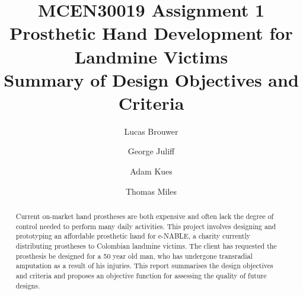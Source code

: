 \documentclass[12pt,3p]{elsarticle}
\begin{document}
\begin{frontmatter}

\title{MCEN30019 Assignment 1 \\
\small Prosthetic Hand Development for Landmine Victims \\
\small Summary of Design Objectives and Criteria}

\author{Lucas Brouwer}
\author{George Juliff}
\author{Adam Kues}
\author{Thomas Miles}

\begin{abstract}
Current on-market hand prostheses are both expensive and often lack the degree of control needed to perform many daily activities. This project involves designing and prototyping an affordable prosthetic hand for e-NABLE, a charity currently distributing prostheses to Colombian landmine victims. The client \citep{Walbran} has requested the prosthesis be designed for a 50 year old man, who has undergone transradial amputation as a result of his injuries. This report summarises the design objectives and criteria and proposes an objective function for assessing the quality of future designs.
\end{abstract}

\end{frontmatter}


\end{document}
